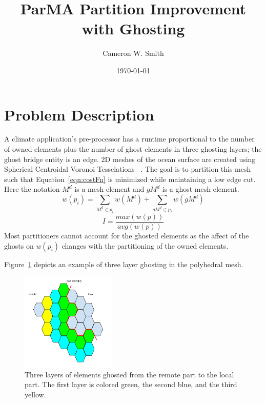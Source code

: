 \documentclass[a4paper]{article}
\title{ParMA Partition Improvement with Ghosting}
\author{Cameron W. Smith}
\date{\today}
\begin{document}
\maketitle

\section{Problem Description}

A climate application's pre-processor has a runtime proportional to the number of owned elements plus the number of ghost elements in three ghosting layers; the ghost bridge entity is an edge.  2D meshes of the ocean surface are created using Spherical Centroidal Voronoi Tesselations ~\cite{JuRingler2011,ringler2008}.  The goal is to partition this mesh such that Equation~\ref{eqn:costFn} is minimized while maintaining a low edge cut.  Here the notation $M^d$ is a mesh element and $gM^d$ is a ghost mesh element.
\begin{equation}
\label{eqn:weightVoroni}
w(p_i) = \sum_{M^d \in p_i}w(M^d) + \sum_{gM^d \in p_i}w(gM^d)
\end{equation}
\begin{equation}
\label{eqn:costFn}
I = \frac{max(w(p))}{avg(w(p))}
\end{equation}
Most partitioners cannot account for the ghosted elements as the affect of the ghosts on $w(p_i)$ changes with the partitioning of the owned elements.  

Figure~\ref{fig:ghostEx} depicts an example of three layer ghosting in the polyhedral mesh.

\begin{figure} 
\centering
\includegraphics[width=0.4\textwidth]{ghostingExample.png}
\caption{\label{fig:ghostEx} Three layers of elements ghosted from the remote part to the local part.  The first layer is colored green, the second blue, and the third yellow.}
\end{figure}
\end{document}
